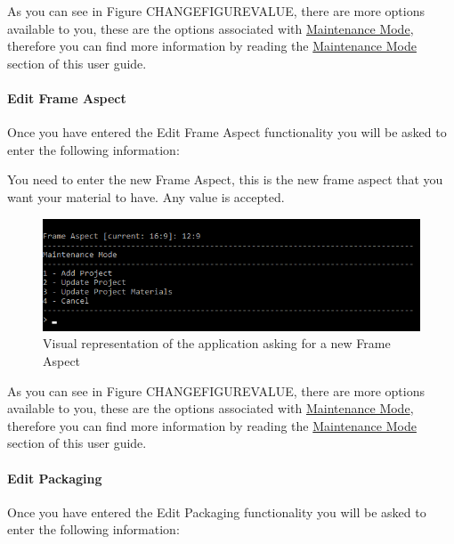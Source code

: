 \documentclass[
  english,
  a4paper,
,tablecaptionabove
]{scrartcl}
\begin{document}
As you can see in Figure CHANGEFIGUREVALUE, there are more options
available to you, these are the options associated with
\protect\hyperlink{using-maintenance-mode}{Maintenance Mode}, therefore
you can find more information by reading the
\protect\hyperlink{using-maintenance-mode}{Maintenance Mode} section of
this user guide.

\newpage

\hypertarget{edit-frame-aspect}{%
\paragraph{Edit Frame Aspect}\label{edit-frame-aspect}}

Once you have entered the Edit Frame Aspect functionality you will be
asked to enter the following information:

You need to enter the new Frame Aspect, this is the new frame aspect
that you want your material to have. Any value is accepted.

\begin{figure}
\centering
\includegraphics{images/user-guide/maintenance-mode/update-project-material-frame-aspect.png}
\caption{Visual representation of the application asking for a new Frame
Aspect}
\end{figure}

As you can see in Figure CHANGEFIGUREVALUE, there are more options
available to you, these are the options associated with
\protect\hyperlink{using-maintenance-mode}{Maintenance Mode}, therefore
you can find more information by reading the
\protect\hyperlink{using-maintenance-mode}{Maintenance Mode} section of
this user guide.

\newpage

\hypertarget{edit-packaging}{%
\paragraph{Edit Packaging}\label{edit-packaging}}

Once you have entered the Edit Packaging functionality you will be asked
to enter the following information:
\end{document}
